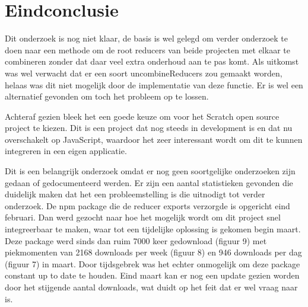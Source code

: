 \section{Eindconclusie}
Dit onderzoek is nog niet klaar, de basis is wel gelegd om verder onderzoek te doen naar een methode om de root reducers van beide projecten met elkaar te combineren zonder dat daar veel extra onderhoud aan te pas komt. Als uitkomst was wel verwacht dat er een soort uncombineReducers zou gemaakt worden, helaas was dit niet mogelijk door de implementatie van deze functie. Er is wel een alternatief gevonden om toch het probleem op te lossen. 

Achteraf gezien bleek het een goede keuze om voor het Scratch open source project te kiezen. Dit is een project dat nog steeds in development is en dat nu overschakelt op JavaScript, waardoor het zeer interessant wordt om dit te kunnen integreren in een eigen applicatie.   

Dit is een belangrijk onderzoek omdat er nog geen soortgelijke onderzoeken zijn gedaan of gedocumenteerd werden.
Er zijn een aantal statistieken gevonden die duidelijk maken dat het een probleemstelling is die uitnodigt tot verder onderzoek. De npm package die de reducer exports verzorgde is opgericht eind februari. Dan werd gezocht naar hoe het mogelijk wordt om dit project snel integreerbaar te maken, waar tot een tijdelijke oplossing is gekomen begin maart. Deze package werd sinds dan ruim 7000 keer gedownload (figuur 9) met piekmomenten van 2168 downloads per week (figuur 8) en 946 downloads per dag (figuur 7) in maart. Door tijdsgebrek was het echter onmogelijk om deze package constant up to date te houden. Eind maart kan er nog een update gezien worden door het stijgende aantal downloads, wat duidt op het feit dat er wel vraag naar is.